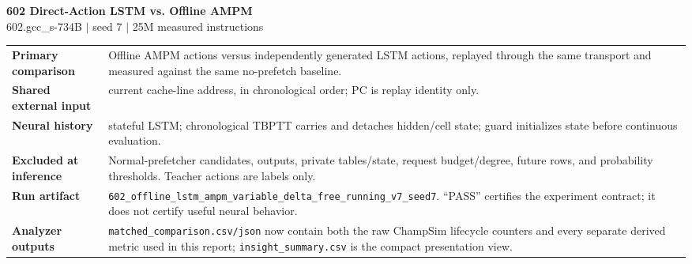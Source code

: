 \documentclass[10pt]{article}
\begin{document}
\begin{center}
{\LARGE\bfseries\color{navy} 602 Direct-Action LSTM vs. Offline AMPM}\\[2pt]
{\small 602.gcc\_s-734B \quad $\vert$ \quad seed 7 \quad $\vert$ \quad 25M measured instructions}\\[4pt]
\quad
{}
\end{center}

\begin{infobox}
\begin{tabularx}{\textwidth}{@{}>{\bfseries}lX@{}}
Primary comparison & Offline AMPM actions versus independently generated LSTM actions, replayed through the same transport and measured against the same no-prefetch baseline.\\
Shared external input & current cache-line address, in chronological order; PC is replay identity only.\\
Neural history & stateful LSTM; chronological TBPTT carries and detaches hidden/cell state; guard initializes state before continuous evaluation.\\
Excluded at inference & Normal-prefetcher candidates, outputs, private tables/state, request budget/degree, future rows, and probability thresholds.  Teacher actions are labels only.\\
Run artifact & \texttt{602\_offline\_lstm\_ampm\_variable\_delta\_free\_running\_v7\_seed7}.  ``PASS'' certifies the experiment contract; it does not certify useful neural behavior.\\
Analyzer outputs & \texttt{matched\_comparison.csv/json} now contain both the
raw ChampSim lifecycle counters and every separate derived metric used in this
report; \texttt{insight\_summary.csv} is the compact presentation view.\\
\end{tabularx}
\end{infobox}
\end{document}
